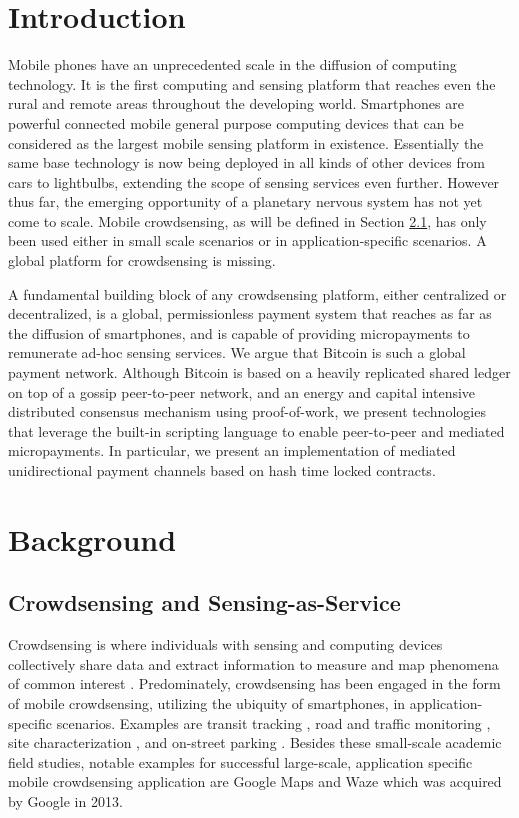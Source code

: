 \section{Introduction}

Mobile phones have an unprecedented scale in the diffusion of computing technology. It is the first computing and sensing platform that reaches even the rural and remote areas throughout the developing world. Smartphones are powerful connected mobile general purpose computing devices that can be considered as the largest mobile sensing platform in existence. Essentially the same base technology is now being deployed in all kinds of other devices from cars to lightbulbs, extending the scope of sensing services even further. However thus far, the emerging opportunity of a planetary nervous system \cite{giannotti2012planetary} has not yet come to scale. Mobile crowdsensing, as will be defined in Section \ref{sec:crowdsensing}, has only been used either in small scale scenarios or in application-specific scenarios. A global platform for crowdsensing is missing.

 A fundamental building block of any crowdsensing platform, either centralized or decentralized, is a global, permissionless payment system that reaches as far as the diffusion of smartphones, and is capable of providing micropayments to remunerate ad-hoc sensing services. We argue that Bitcoin is such a global payment network. Although Bitcoin is based on a heavily replicated shared ledger on top of a gossip peer-to-peer network, and an energy and capital intensive distributed consensus mechanism using proof-of-work, we present technologies that leverage the built-in scripting language to enable peer-to-peer and mediated micropayments. In particular, we present an implementation of mediated unidirectional payment channels based on hash time locked contracts.


\section{Background}

\subsection{Crowdsensing and Sensing-as-Service}
\label{sec:crowdsensing}

Crowdsensing is where individuals with sensing and computing devices collectively share data and extract information to measure and map phenomena of common interest \cite{ganti2011mobile}. Predominately, crowdsensing has been engaged in the form of mobile crowdsensing, utilizing the ubiquity of smartphones, in application-specific scenarios. Examples are transit tracking \cite{Thiagarajan:2010:CTT:1869983.1869993}, road and traffic monitoring \cite{Mohan:2008:NRM:1460412.1460444}, site characterization \cite{Chon:2012:ACP:2370216.2370288}, and on-street parking \cite{Chen:2012:COS:2386958.2386960,6569416}. Besides these small-scale academic field studies, notable examples for successful large-scale, application specific mobile crowdsensing application are Google Maps and Waze which was acquired by Google in 2013.   

